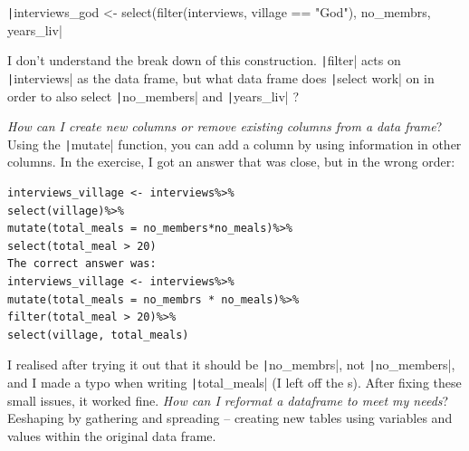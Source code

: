 \documentclass{article}
\begin{document}
\texttt|interviews_god <- select(filter(interviews, village == "God"), no_membrs, years_liv|


I don’t understand the break down of this construction. \texttt|filter| acts on 
\texttt|interviews| as the data frame, but what data frame does \texttt|select work| on in order to also select \texttt|no_members| and \texttt|years_liv| ?




\textit{How can I create new columns or remove existing columns from a data frame}?
Using the \texttt|mutate| function, you can add a column by using information in other columns.
In the exercise, I got an answer that was close, but in the wrong order:
\begin{verbatim}
interviews_village <- interviews%>%
select(village)%>%
mutate(total_meals = no_members*no_meals)%>%
select(total_meal > 20)
The correct answer was:
interviews_village <- interviews%>%
mutate(total_meals = no_membrs * no_meals)%>%
filter(total_meal > 20)%>%
select(village, total_meals)
\end{verbatim}
I realised after trying it out that it should be \texttt|no_membrs|, not \texttt|no_members|, and I made a typo when writing \texttt|total_meals| (I left off the s).
After fixing these small issues, it worked fine.
\textit{How can I reformat a dataframe to meet my needs}?
Eeshaping by gathering and spreading – creating new tables using variables and values within the original data frame.
\end{document}

